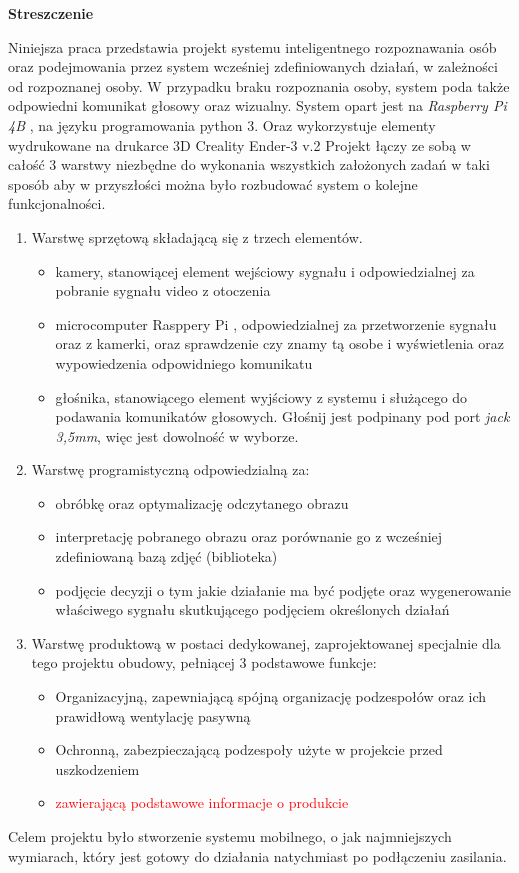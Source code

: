 \documentclass[a4paper,12pt,reqno]{article}
\begin{document}
\begin{flushleft}
\Large \textbf{Streszczenie}
\end{flushleft}
\vspace{1cm}
Niniejsza praca przedstawia projekt systemu inteligentnego rozpoznawania osób oraz podejmowania przez system wcześniej zdefiniowanych działań, w zależności od rozpoznanej osoby. W przypadku braku rozpoznania osoby, system poda także odpowiedni komunikat głosowy oraz wizualny. 
\newline
System opart jest na \textit{Raspberry Pi 4B} \cite{RP4B}, na języku programowania python 3. Oraz wykorzystuje elementy wydrukowane na drukarce 3D Creality Ender-3 v.2
\newline
Projekt łączy ze sobą w całość 3 warstwy niezbędne do wykonania wszystkich założonych zadań w taki sposób aby w przyszłości można było rozbudować system o kolejne funkcjonalności.
\begin{enumerate} %
  \item Warstwę sprzętową składającą się z trzech elementów.
  \begin{itemize}
  	\item kamery, stanowiącej element wejściowy sygnału i odpowiedzialnej za pobranie sygnału video z otoczenia
  	\item microcomputer Rasppery Pi \cite{RP4B}, odpowiedzialnej za przetworzenie sygnału oraz z kamerki, oraz sprawdzenie czy znamy tą osobe i wyświetlenia oraz wypowiedzenia odpowidniego komunikatu
  	\item głośnika, stanowiącego element wyjściowy z systemu i służącego do podawania komunikatów głosowych. Głośnij jest podpinany pod port \textit{jack 3,5mm}, więc jest dowolność w wyborze.
  \end{itemize}
  \item Warstwę programistyczną odpowiedzialną za:
  \begin{itemize}
  	\item obróbkę oraz optymalizację odczytanego obrazu
  	\item interpretację pobranego obrazu oraz porównanie go z wcześniej zdefiniowaną bazą zdjęć (biblioteka)
  	\item podjęcie decyzji o tym jakie działanie ma być podjęte oraz wygenerowanie właściwego sygnału skutkującego podjęciem określonych działań
  \end{itemize}
  \item Warstwę produktową w postaci dedykowanej, zaprojektowanej specjalnie dla tego projektu obudowy, pełniącej 3 podstawowe funkcje:
  \begin{itemize}
  	\item Organizacyjną, zapewniającą spójną organizację podzespołów oraz ich prawidłową wentylację pasywną
  	\item Ochronną, zabezpieczającą podzespoły użyte w projekcie przed uszkodzeniem
  	\item \textcolor{red}{zawierającą podstawowe informacje o produkcie}
  \end{itemize}
\end{enumerate}
Celem projektu było stworzenie systemu mobilnego, o jak najmniejszych wymiarach, który jest gotowy do działania natychmiast po podłączeniu zasilania.
\end{document}
